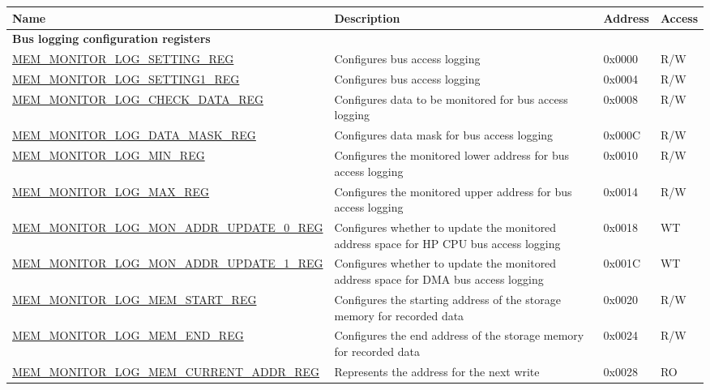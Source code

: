 \begin{longtable}{ | l | m{13cm} | l | l | }
\hline\rowcolor{lightgray}
{\bfseries Name} & {\bfseries Description} &  {\bfseries Address} & {\bfseries Access} \\ \hline
\endhead
\multicolumn{4}{|l|}{\textbf{Bus logging configuration registers}} \\ \hline
\hyperref[regdesc:MEMMONITORLOGSETTINGREG]{MEM\_MONITOR\_LOG\_SETTING\_REG} & Configures bus access logging  & 0x0000 & R/W \\ \hline
\hyperref[regdesc:MEMMONITORLOGSETTING1REG]{MEM\_MONITOR\_LOG\_SETTING1\_REG} & Configures bus access logging & 0x0004 & R/W \\ \hline
\hyperref[regdesc:MEMMONITORLOGCHECKDATAREG]{MEM\_MONITOR\_LOG\_CHECK\_DATA\_REG} & Configures data to be monitored for bus access logging & 0x0008 & R/W \\ \hline
\hyperref[regdesc:MEMMONITORLOGDATAMASKREG]{MEM\_MONITOR\_LOG\_DATA\_MASK\_REG} & Configures data mask for bus access logging & 0x000C & R/W \\ \hline
\hyperref[regdesc:MEMMONITORLOGMINREG]{MEM\_MONITOR\_LOG\_MIN\_REG} & Configures the monitored lower address for bus access logging & 0x0010 & R/W \\ \hline
\hyperref[regdesc:MEMMONITORLOGMAXREG]{MEM\_MONITOR\_LOG\_MAX\_REG} & Configures the monitored upper address for bus access logging & 0x0014 & R/W \\ \hline
\hyperref[regdesc:MEMMONITORLOGMONADDRUPDATE0REG]{MEM\_MONITOR\_LOG\_MON\_ADDR\_UPDATE\_0\_REG} & Configures whether to update the monitored address space for HP CPU bus access logging & 0x0018 & WT \\ \hline
\hyperref[regdesc:MEMMONITORLOGMONADDRUPDATE1REG]{MEM\_MONITOR\_LOG\_MON\_ADDR\_UPDATE\_1\_REG} & Configures whether to update the monitored address space for DMA bus access logging & 0x001C & WT \\ \hline
\hyperref[regdesc:MEMMONITORLOGMEMSTARTREG]{MEM\_MONITOR\_LOG\_MEM\_START\_REG} & Configures the starting address of the storage memory for recorded data & 0x0020 & R/W \\ \hline
\hyperref[regdesc:MEMMONITORLOGMEMENDREG]{MEM\_MONITOR\_LOG\_MEM\_END\_REG} & Configures the end address of the storage memory for recorded data & 0x0024 & R/W \\ \hline
\hyperref[regdesc:MEMMONITORLOGMEMCURRENTADDRREG]{MEM\_MONITOR\_LOG\_MEM\_CURRENT\_ADDR\_REG} & Represents the address for the next write & 0x0028 & RO \\ \hline

\end{longtable}
